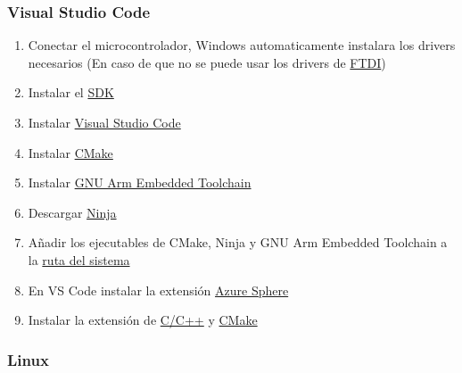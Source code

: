 \subsubsection*{Visual Studio Code}
\begin{enumerate}
	\item 
	Conectar el microcontrolador, Windows automaticamente instalara los drivers necesarios (En caso de que no se puede usar los drivers de \href{https://www.ftdichip.com/Drivers/VCP.htm}{FTDI})
	\item 
	Instalar el \href{https://aka.ms/AzureSphereSDKDownload/Windows}{SDK}
	\item 
	Instalar \href{https://code.visualstudio.com/}{Visual Studio Code}
	\item 
	Instalar \href{https://cmake.org/download/}{CMake}
	\item 
	Instalar \href{https://developer.arm.com/downloads/-/gnu-rm}{GNU Arm Embedded Toolchain}
	\item 
	Descargar \href{https://github.com/ninja-build/ninja/releases}{Ninja}
	\item 
	Añadir los ejecutables de CMake, Ninja y GNU Arm Embedded Toolchain a la \href{https://stackoverflow.com/questions/44272416/how-to-add-a-folder-to-path-environment-variable-in-windows-10-with-screensho}{ruta del sistema} 
	\item 
	En VS Code instalar la extensión \href{https://marketplace.visualstudio.com/items?itemName=ms-vscode.azure-sphere-tools}{Azure Sphere}
	\item Instalar la extensión de \href{https://marketplace.visualstudio.com/items?itemName=ms-vscode.cpptools}{C/C++} y \href{https://marketplace.visualstudio.com/items?itemName=ms-vscode.cmake-tools}{CMake}
\end{enumerate}

\subsubsection{Linux}
